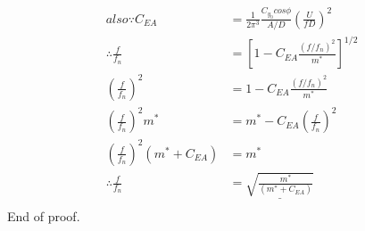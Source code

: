 \begin{appendices}
\begin{align*}
	also \because C_{EA}&=\frac{1}{2 \pi ^3} \frac{ C_{y_0} cos \phi}{A/D} (\frac{U}{fD})^2 \\
	\therefore
	\frac{f}{f_n}&=[1-C_{EA}\frac{(f/f_n)^2}{ m^*   }]^{1/2}\\
	(\frac{f}{f_n})^2&=1-C_{EA}\frac{(f/f_n)^2}{ m^*   }\\
	(\frac{f}{f_n})^2 m^*&=m^*-C_{EA}(\frac{f}{ f_n   })^2\\
	(\frac{f}{f_n})^2 (m^*+C_{EA})&=m^*\\
	\therefore
	\frac{f}{f_n}&=\underline{ \sqrt{\frac{m^*  }{(m^*  +C_{EA})}} }\\
\end{align*}
End of proof.

%
%

\end{appendices}